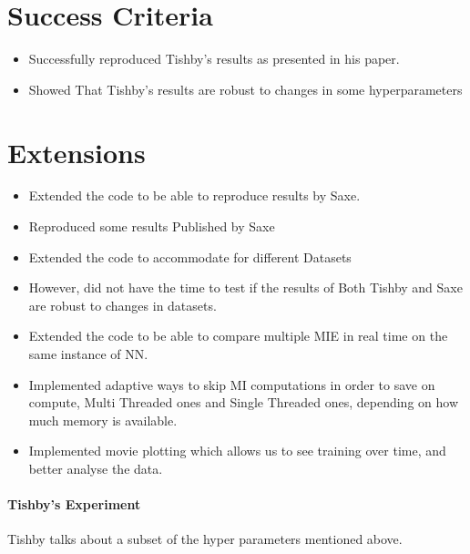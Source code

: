 \documentclass[dissertation.tex]{subfiles}
\begin{document}
\section{Success Criteria}

\begin{itemize}
  \item{
      Successfully reproduced Tishby's results as presented in his paper.
    }
  \item{
      Showed That Tishby's results are robust to changes in some hyperparameters
    }
\end{itemize}

\section{Extensions}

\begin{itemize}
  \item{
      Extended the code to be able to reproduce results by Saxe.
    }
  \item{
      Reproduced some results Published by Saxe
    }
  \item{
      Extended the code to accommodate for different Datasets
    }
  \item{
      However, did not have the time to test if the results of Both Tishby and
      Saxe are robust to changes in datasets.
    }
  \item{
      Extended the code to be able to compare multiple MIE in real time on the
      same instance of NN.
    }
  \item{
      Implemented adaptive ways to skip MI computations in order to save on
      compute, Multi Threaded ones and Single Threaded ones, depending on how
      much memory is available.
    }
  \item{
      Implemented movie plotting which allows us to see training over time, and
      better analyse the data.
    }
\end{itemize}


\paragraph{Tishby's Experiment} 

Tishby\cite{TISBHY} talks about a subset of the hyper parameters mentioned
above. 
\end{document}
